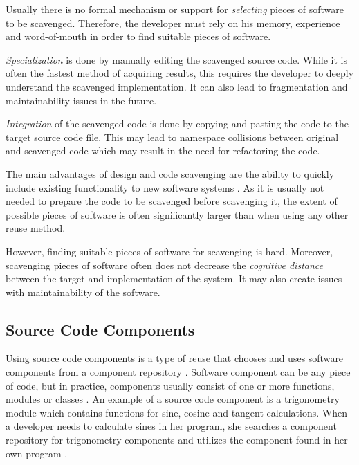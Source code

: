 Usually there is no formal mechanism or support for \emph{selecting} pieces of software to be scavenged. Therefore, the developer must rely on his memory, experience and word-of-mouth in order to find suitable pieces of software. \citep[chap.~3]{sametinger_software_1997}

\emph{Specialization} is done by manually editing the scavenged source code. While it is often the fastest method of acquiring results, this requires the developer to deeply understand the scavenged implementation. It can also lead to fragmentation and maintainability issues in the future. \citep[chap.~4]{krueger_software_1992}

\emph{Integration} of the scavenged code is done by copying and pasting the code to the target source code file. This may lead to namespace collisions between original and scavenged code which may result in the need for refactoring the code. \citep[chap.~4]{krueger_software_1992}

The main advantages of design and code scavenging are the ability to quickly include existing functionality to new software systems \citep[chap.~4]{krueger_software_1992}. As it is usually not needed to prepare the code to be scavenged before scavenging it, the extent of possible pieces of software is often significantly larger than when using any other reuse method. 

However, finding suitable pieces of software for scavenging is hard. Moreover, scavenging pieces of software often does not decrease the \emph{cognitive distance} between the target and implementation of the system. It may also create issues with maintainability of the software. \citep[chap.~4]{krueger_software_1992}

\subsection{Source Code Components}

Using source code components is a type of reuse that chooses and uses software components from a component repository \citep[chap.~3]{sametinger_software_1997}. Software component can be any piece of code, but in practice, components usually consist of one or more functions, modules or classes \citep[chap.~3]{sametinger_software_1997}. An example of a source code component is a trigonometry module which contains functions for sine, cosine and tangent calculations. When a developer needs to calculate sines in her program, she searches a component repository for trigonometry components and utilizes the component found in her own program \citep[chap.~5]{krueger_software_1992}.

